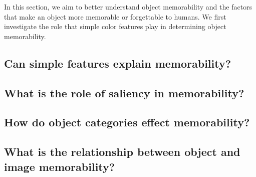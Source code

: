 In this section, we aim to better understand object memorability and the factors that make an object more memorable or forgettable to humans. We first investigate the role that simple color features play in determining object memorability.

\subsection{Can simple features explain memorability?}



\subsection{What is the role of saliency in memorability?}



\subsection{How do object categories effect memorability?}



\subsection{What is the relationship between object and image memorability?}

 